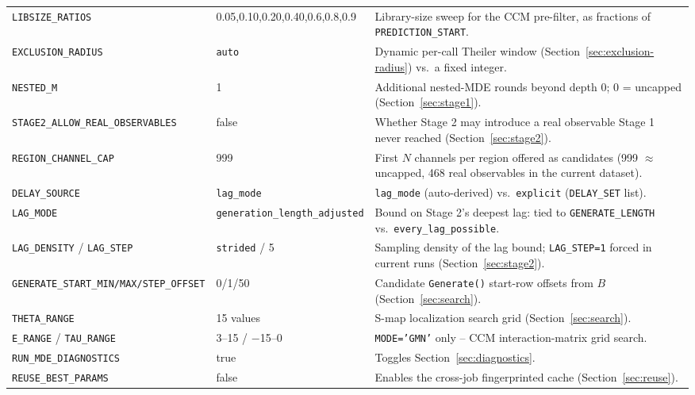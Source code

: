 \documentclass[11pt]{article}
\begin{document}
\begin{longtable}{@{}>{\raggedright\arraybackslash}p{4.0cm}>{\raggedright\arraybackslash\small}p{2.6cm}>{\raggedright\arraybackslash}p{7.9cm}@{}}
\texttt{LIBSIZE_RATIOS} & 0.05,0.10,0.20,0.40,0.6,0.8,0.9 & Library-size sweep for the CCM pre-filter, as fractions of \texttt{PREDICTION\_START}. \\
\texttt{EXCLUSION_RADIUS} & \texttt{auto} & Dynamic per-call Theiler window (Section~\ref{sec:exclusion-radius}) vs.\ a fixed integer. \\
\texttt{NESTED_M} & 1 & Additional nested-MDE rounds beyond depth 0; 0 = uncapped (Section~\ref{sec:stage1}). \\
\texttt{STAGE2_ALLOW_REAL_OBSERVABLES} & false & Whether Stage 2 may introduce a real observable Stage 1 never reached (Section~\ref{sec:stage2}). \\
\texttt{REGION_CHANNEL_CAP} & 999 & First $N$ channels per region offered as candidates (999 $\approx$ uncapped, 468 real observables in the current dataset). \\
\texttt{DELAY_SOURCE} & \texttt{lag_mode} & \texttt{lag_mode} (auto-derived) vs.\ \texttt{explicit} (\texttt{DELAY\_SET} list). \\
\texttt{LAG_MODE} & \texttt{generation_length_adjusted} & Bound on Stage 2's deepest lag: tied to \texttt{GENERATE\_LENGTH} vs.\ \texttt{every_lag_possible}. \\
\texttt{LAG_DENSITY} / \texttt{LAG_STEP} & \texttt{strided} / 5 & Sampling density of the lag bound; \texttt{LAG\_STEP=1} forced in current runs (Section~\ref{sec:stage2}). \\
\texttt{GENERATE_START_MIN/MAX/STEP_OFFSET} & 0/1/50 & Candidate \texttt{Generate()} start-row offsets from $B$ (Section~\ref{sec:search}). \\
\texttt{THETA_RANGE} & 15 values & S-map localization search grid (Section~\ref{sec:search}). \\
\texttt{E_RANGE} / \texttt{TAU_RANGE} & 3--15 / $-$15--0 & \texttt{MODE='GMN'} only -- CCM interaction-matrix grid search. \\
\texttt{RUN_MDE_DIAGNOSTICS} & true & Toggles Section~\ref{sec:diagnostics}. \\
\texttt{REUSE_BEST_PARAMS} & false & Enables the cross-job fingerprinted cache (Section~\ref{sec:reuse}). \\
\bottomrule
\end{longtable}

\newpage
\end{document}
